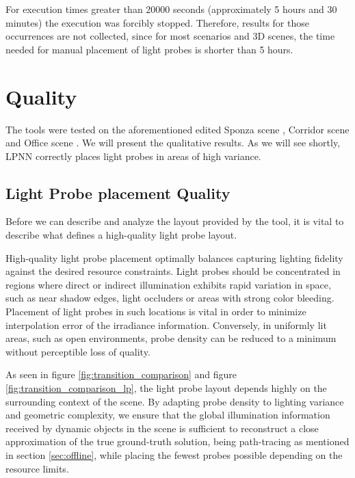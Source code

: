 For execution times greater than 20000 seconds (approximately 5 hours and 30 minutes) the execution was forcibly stopped. Therefore, results for those occurrences are not collected, since for most scenarios and 3D scenes, the time needed for manual placement of light probes is shorter than 5 hours.

\section{Quality}
\label{sec:4_quality}

The tools were tested on the aforementioned edited Sponza scene \parencite{Sponza2017}, Corridor scene \parencite{Corridor2021} and Office scene \parencite{Office2021}. We will present the qualitative results. As we will see shortly, LPNN correctly places light probes in areas of high variance.

\subsection{Light Probe placement Quality}
\label{sec:lp_quality}

Before we can describe and analyze the layout provided by the tool, it is vital to describe what defines a high-quality light probe layout.

High-quality light probe placement optimally balances capturing lighting fidelity against the desired resource constraints. Light probes should be concentrated in regions where direct or indirect illumination exhibits rapid variation in space, such as near shadow edges, light occluders or areas with strong color bleeding. Placement of light probes in such locations is vital in order to minimize interpolation error of the irradiance information. Conversely, in uniformly lit areas, such as open environments, probe density can be reduced to a minimum without perceptible loss of quality.

As seen in figure \ref{fig:transition_comparison} and figure \ref{fig:transition_comparison_lp}, the light probe layout depends highly on the surrounding context of the scene. By adapting probe density to lighting variance and geometric complexity, we ensure that the global illumination information received by dynamic objects in the scene is sufficient to reconstruct a close approximation of the true ground-truth solution, being path-tracing as mentioned in section \ref{sec:offline}, while placing the fewest probes possible depending on the resource limits.

